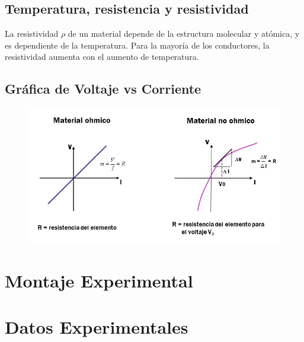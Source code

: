 \documentclass[letterpaper, 12pt]{article}
\begin{document}
\subsection*{Temperatura, resistencia y resistividad}

La resistividad $\rho$ de un material depende de la estructura molecular y
atómica, y es dependiente de la temperatura. Para la mayoría de los conductores,
la resistividad aumenta con el aumento de temperatura.~\cite{KhanAcademy}

\subsection*{Gráfica de Voltaje vs Corriente}

\begin{figure}[H]
	\begin{center}
		\includegraphics[scale = 0.5]{./Images/VoltajeVsResistencia.jpg}
	\end{center}
\end{figure}


\section{Montaje Experimental}

\section{Datos Experimentales}
\end{document}
